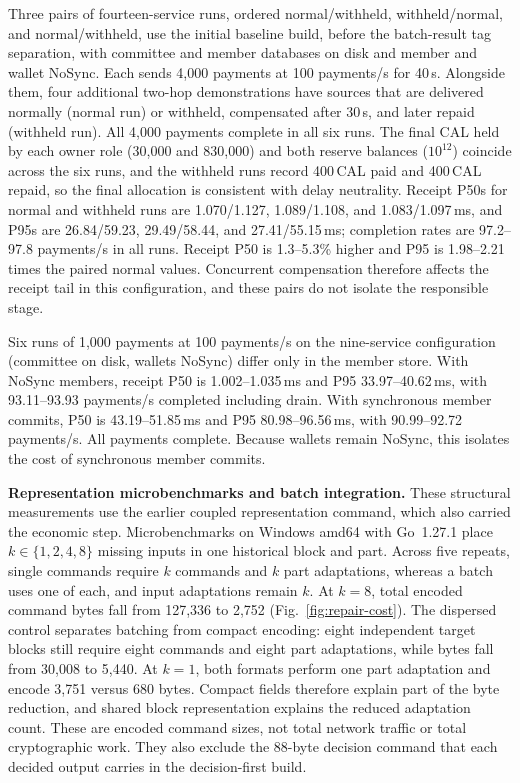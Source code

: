 Three pairs of fourteen-service runs, ordered normal/withheld,
withheld/normal, and normal/withheld, use the initial baseline build, before
the batch-result tag separation, with committee and member databases on disk
and member and wallet NoSync. Each sends 4,000 payments at 100 payments/s for
40\,s. Alongside them, four additional two-hop demonstrations have sources
that are delivered normally (normal run) or withheld, compensated after
30\,s, and later repaid (withheld run). All 4,000 payments complete in all six
runs. The final CAL held by each owner role (30,000 and 830,000) and both
reserve balances ($10^{12}$) coincide across the six runs, and the withheld
runs record 400\,CAL paid and 400\,CAL repaid, so the final allocation is
consistent with delay neutrality. Receipt P50s for normal and withheld runs
are 1.070/1.127, 1.089/1.108, and 1.083/1.097\,ms, and P95s are
26.84/59.23, 29.49/58.44, and 27.41/55.15\,ms; completion rates are
97.2--97.8 payments/s in all runs. Receipt P50 is 1.3--5.3\% higher and P95 is
1.98--2.21 times the paired normal values. Concurrent compensation therefore
affects the receipt tail in this configuration, and these pairs do not
isolate the responsible stage.

Six runs of 1,000 payments at 100 payments/s on the nine-service
configuration (committee on disk, wallets NoSync) differ only in the member
store. With NoSync members, receipt P50 is 1.002--1.035\,ms and P95
33.97--40.62\,ms, with 93.11--93.93 payments/s completed including drain.
With synchronous member commits, P50 is 43.19--51.85\,ms and P95
80.98--96.56\,ms, with 90.99--92.72 payments/s. All payments complete. Because
wallets remain NoSync, this isolates the cost of synchronous member commits.

\noindent\textbf{Representation microbenchmarks and batch integration.}
These structural measurements use the earlier coupled representation command,
which also carried the economic step. Microbenchmarks on Windows amd64 with
Go~1.27.1 place $k\in\{1,2,4,8\}$ missing inputs in one historical block and
part. Across five repeats, single commands require $k$ commands and $k$ part
adaptations, whereas a batch uses one of each, and input adaptations remain
$k$. At $k=8$, total encoded command bytes fall from 127,336 to 2,752
(Fig.~\ref{fig:repair-cost}). The dispersed control separates batching from
compact encoding: eight independent target blocks still require eight
commands and eight part adaptations, while bytes fall from 30,008 to 5,440. At
$k=1$, both formats perform one part adaptation and encode 3,751 versus 680
bytes. Compact fields therefore explain part of the byte reduction, and
shared block representation explains the reduced adaptation count. These are
encoded command sizes, not total network traffic or total cryptographic work.
They also exclude the 88-byte decision command that each decided output
carries in the decision-first build.

